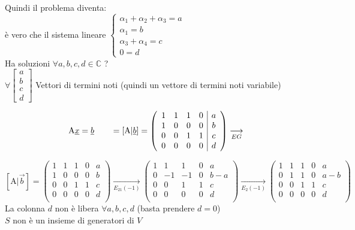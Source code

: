 \color{blue}
Quindi il problema diventa:\\
è vero che il sistema lineare 
$
\begin{cases}
    \alpha_1+\alpha_2+ \alpha_3 = a\\
    \alpha_1 = b\\
    \alpha_3 + \alpha_4 = c\\
    0 = d
\end{cases}
$\\
Ha soluzioni 
\color{red}
$\forall a,b,c,d \in \mathbb{C}$ ?\\
\color{blue}
$ 
    \forall 
    \begin{bmatrix}
        a\\b\\c\\d
    \end{bmatrix}
$
Vettori di termini noti 
(quindi un vettore di termini noti variabile)
\color{black}

$$
\textrm{A}\vec{x}=\vec{b} \hspace{0.7cm} = [\textrm{A}|\vec{b}]=
\left(
\begin{array}{cccc|c}
    1 & 1 & 1 & 0 & a\\
    1 & 0 & 0 & 0 & b\\
    0 & 0 & 1 & 1 & c\\
    0 & 0 & 0 & 0 & d\\
\end{array}
\right)
\underset{EG}{\longrightarrow}
$$

\[
    [\textrm{A}|\vec{b}]= 
    \left(
    \begin{array}{cccc|c}
        1 & 1 & 1 & 0 & a\\
        1 & 0 & 0 & 0 & b\\
        0 & 0 & 1 & 1 & c\\
        0 & 0 & 0 & 0 & d\\
    \end{array}
    \right)
    \underset{E_{21}(-1)}{\longrightarrow}
    \left(
    \begin{array}{cccc|c}
        1 & 1 & 1 & 0 & a\\
        0 & -1 & -1 & 0 & b-a\\
        0 & 0 & 1 & 1 & c\\
        0 & 0 & 0 & 0 & d\\
    \end{array}
    \right)
    \underset{E_{2}(-1)}{\longrightarrow}
    \left(
    \begin{array}{cccc|c}
        1 & 1 & 1 & 0 & a\\
        0 & 1 & 1 & 0 & a-b\\
        0 & 0 & 1 & 1 & c\\
        0 & 0 & 0 & 0 & d\\
    \end{array}
    \right)
\]
La colonna $d$ non è libera $\forall a, b, c, d$ (basta prendere $d=0$)\\
$S$ non è un insieme di generatori di $V$ \\

